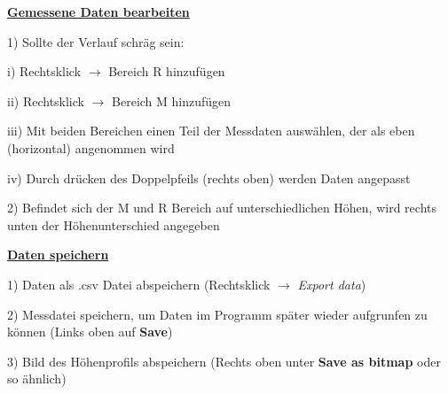\documentclass[12pt,a4paper]{article}
\begin{document}
\begin{description}
\begin{center}
\underline{\textbf{Gemessene Daten bearbeiten}}
\end{center}

\begin{description}
\item 1) Sollte der Verlauf schräg sein:
\begin{description}
\item i) Rechtsklick $\rightarrow$ Bereich R hinzufügen
\item ii) Rechtsklick $\rightarrow$ Bereich M hinzufügen
\item iii) Mit beiden Bereichen einen Teil der Messdaten auswählen, der als eben (horizontal) angenommen wird
\item iv) Durch drücken des Doppelpfeils (rechts oben) werden Daten angepasst
\end{description}

\item 2) Befindet sich der M und R Bereich auf unterschiedlichen Höhen, wird rechts unten der Höhenunterschied angegeben

\begin{center}
\underline{\textbf{Daten speichern}}
\end{center}

\begin{description}
\item 1) Daten als .csv Datei abspeichern (Rechtsklick $\rightarrow$ \textit{Export data})

\item 2) Messdatei speichern, um Daten im Programm später wieder aufgrunfen zu können (Links oben auf \textbf{Save})

\item 3) Bild des Höhenprofils abspeichern (Rechts oben unter \textbf{Save as bitmap} oder so ähnlich)
\end{description}

\end{description}

\end{description}
\end{document}
